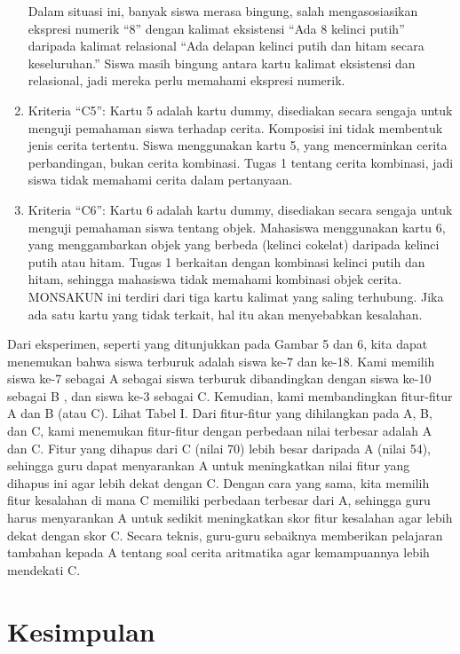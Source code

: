 \begin{enumerate}
\begin{itemize}
\begin{enumerate}[label=(\alph*)]
                    \end{enumerate}
            \end{itemize}
            Dalam situasi ini, banyak siswa merasa bingung, salah mengasosiasikan ekspresi numerik “8” dengan kalimat eksistensi “Ada 8 kelinci putih” daripada kalimat relasional “Ada delapan kelinci putih dan hitam secara keseluruhan.” Siswa masih bingung antara kartu kalimat eksistensi dan relasional, jadi mereka perlu memahami ekspresi numerik.
        \item Kriteria “C5”: Kartu 5 adalah kartu dummy, disediakan secara sengaja untuk menguji pemahaman siswa terhadap cerita. Komposisi ini tidak membentuk jenis cerita tertentu. Siswa menggunakan kartu 5, yang mencerminkan cerita perbandingan, bukan cerita kombinasi. Tugas 1 tentang cerita kombinasi, jadi siswa tidak memahami cerita dalam pertanyaan.
        \item Kriteria “C6”: Kartu 6 adalah kartu dummy, disediakan secara sengaja untuk menguji pemahaman siswa tentang objek. Mahasiswa menggunakan kartu 6, yang menggambarkan objek yang berbeda (kelinci cokelat) daripada kelinci putih atau hitam. Tugas 1 berkaitan dengan kombinasi kelinci putih dan hitam, sehingga mahasiswa tidak memahami kombinasi objek cerita. MONSAKUN ini terdiri dari tiga kartu kalimat yang saling terhubung. Jika ada satu kartu yang tidak terkait, hal itu akan menyebabkan kesalahan.
    \end{enumerate}

    Dari eksperimen, seperti yang ditunjukkan pada Gambar 5 dan 6, kita dapat menemukan bahwa siswa terburuk adalah siswa ke-7 dan ke-18. Kami memilih siswa ke-7 sebagai A sebagai siswa terburuk dibandingkan dengan siswa ke-10 sebagai B , dan siswa ke-3 sebagai C. Kemudian, kami membandingkan fitur-fitur A dan B (atau C). Lihat Tabel I. Dari fitur-fitur yang dihilangkan pada A, B, dan C, kami menemukan fitur-fitur dengan perbedaan nilai terbesar adalah A dan C. Fitur yang dihapus dari C (nilai 70) lebih besar daripada A (nilai 54), sehingga guru dapat menyarankan A untuk meningkatkan nilai fitur yang dihapus ini agar lebih dekat dengan C. Dengan cara yang sama, kita memilih fitur kesalahan di mana C memiliki perbedaan terbesar dari A, sehingga guru harus menyarankan A untuk sedikit meningkatkan skor fitur kesalahan agar lebih dekat dengan skor C. Secara teknis, guru-guru sebaiknya memberikan pelajaran tambahan kepada A tentang soal cerita aritmatika agar kemampuannya lebih mendekati C.

\section{Kesimpulan}

